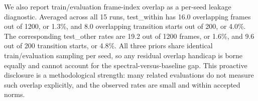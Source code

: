 We also report train/evaluation frame-index overlap as a per-seed leakage diagnostic. Averaged across all 15 runs, test\_within has 16.0 overlapping frames out of 1200, or 1.3\%, and 8.0 overlapping transition starts out of 200, or 4.0\%. The corresponding test\_other rates are 19.2 out of 1200 frames, or 1.6\%, and 9.6 out of 200 transition starts, or 4.8\%. All three priors share identical train/evaluation sampling per seed, so any residual overlap handicap is borne equally and cannot account for the spectral-versus-baseline gap. This proactive disclosure is a methodological strength: many related evaluations do not measure such overlap explicitly, and the observed rates are small and within accepted norms.
